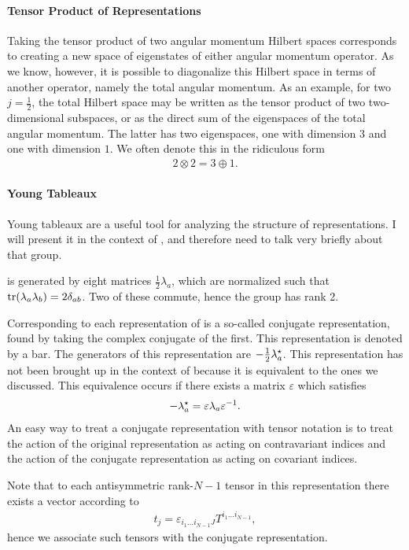 \paragraph{Tensor Product of  Representations}
Taking the tensor product of two angular momentum Hilbert spaces corresponds to creating a new space of eigenstates of either angular momentum operator. As we know, however, it is possible to diagonalize this Hilbert space in terms of another operator, namely the total angular momentum. As an example, for two $j = \frac{1}{2}$, the total Hilbert space may be written as the tensor product of two two-dimensional subspaces, or as the direct sum of the eigenspaces of the total angular momentum. The latter has two eigenspaces, one with dimension $3$ and one with dimension $1$. We often denote this in the ridiculous form
\begin{align*}
	2\otimes 2 = 3\oplus 1.
\end{align*}

\paragraph{Young Tableaux}
Young tableaux are a useful tool for analyzing the structure of representations. I will present it in the context of , and therefore need to talk very briefly about that group.

 is generated by eight matrices $\frac{1}{2}\lambda_{a}$, which are normalized such that $\tr(\lambda_{a}\lambda_{b}) = 2\delta_{ab}$. Two of these commute, hence the group has rank 2.

Corresponding to each representation of  is a so-called conjugate representation, found by taking the complex conjugate of the first. This representation is denoted by a bar. The generators of this representation are $-\frac{1}{2}\lambda_{a}^{\star}$. This representation has not been brought up in the context of  because it is equivalent to the ones we discussed. This equivalence occurs if there exists a matrix $\varepsilon$ which satisfies
\begin{align*}
	-\lambda_{a}^{\star} = \varepsilon\lambda_{a}\varepsilon^{-1}.
\end{align*}
An easy way to treat a conjugate representation with tensor notation is to treat the action of the original representation as acting on contravariant indices and the action of the conjugate representation as acting on covariant indices.

Note that to each antisymmetric rank-$N - 1$ tensor in this representation there exists a vector according to
\begin{align*}
	t_{j} = \varepsilon_{i_{1}\dots i_{N - 1}J}T^{i_{1}\dots i_{N - 1}},
\end{align*}
hence we associate such tensors with the conjugate representation.


